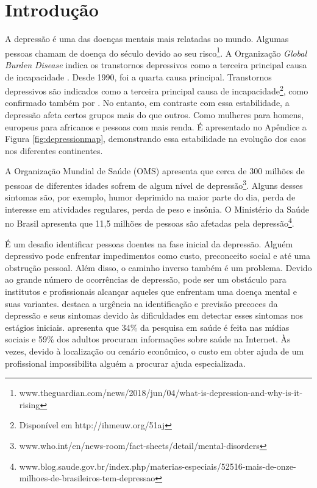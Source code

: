 \documentclass[11pt, notitlepage]{article} %
\begin{document}
\section*{Introdução}

A depressão é uma das doenças mentais mais relatadas no mundo. Algumas pessoas chamam de doença do século devido ao seu risco\footnote{www.theguardian.com/news/2018/jun/04/what-is-depression-and-why-is-it-rising}. 
A Organização \emph{Global Burden Disease} indica os transtornos depressivos como a terceira principal causa de incapacidade \cite{IHME}. Desde 1990, foi a quarta causa principal. 
Transtornos depressivos são indicados como a terceira principal causa de incapacidade\footnote{Disponível em http://ihmeuw.org/51aj}, como confirmado também por \cite{brody2018prevalence}. No entanto, em contraste com essa estabilidade, a depressão afeta certos grupos mais do que outros. Como mulheres para homens, europeus para africanos e pessoas com mais renda. É apresentado no Apêndice a Figura \ref{fig:depressionmap}, demonstrando essa estabilidade na evolução dos caos nos diferentes continentes.

A Organização Mundial de Saúde (OMS) apresenta que cerca de 300 milhões de pessoas de diferentes idades sofrem de algum nível de depressão\footnote{www.who.int/en/news-room/fact-sheets/detail/mental-disorders}. 
Alguns desses sintomas são, por exemplo, humor deprimido na maior parte do dia, perda de interesse em atividades regulares, perda de peso e insônia.
O Ministério da Saúde no Brasil apresenta que 11,5 milhões de pessoas são afetadas pela depressão\footnote{www.blog.saude.gov.br/index.php/materias-especiais/52516-mais-de-onze-milhoes-de-brasileiros-tem-depressao}.

É um desafio identificar pessoas doentes na fase inicial da depressão. Alguém depressivo pode enfrentar impedimentos como custo, preconceito social e até uma obstrução pessoal. Além disso, o caminho inverso também é um problema. Devido ao grande número de ocorrências de depressão, pode ser um obstáculo para institutos e profissionais alcançar aqueles que enfrentam uma doença mental e suas variantes. \cite{Lech2014} destaca a urgência na identificação e previsão precoces da depressão e seus sintomas devido às dificuldades em detectar esses sintomas nos estágios iniciais. \cite{elkin2008america} apresenta que 34\% da pesquisa em saúde é feita nas mídias sociais e 59\% dos adultos procuram informações sobre saúde na Internet.
Às vezes, devido à localização ou cenário econômico, o custo em obter ajuda de um profissional impossibilita alguém a procurar ajuda especializada.
\end{document}
